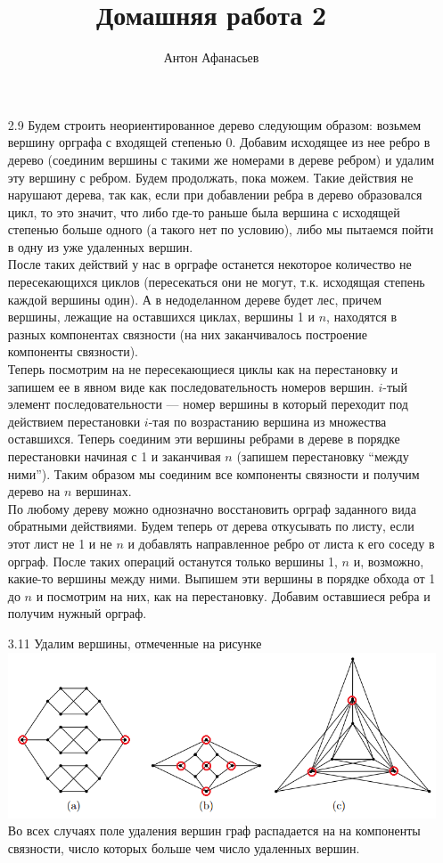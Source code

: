 \documentclass[10pt]{article}
\begin{document}
\title{Домашняя работа 2}
\author{Антон Афанасьев}
\maketitle

\begin{enumerate}

\item[2.9] Будем строить неориентированное дерево следующим образом: возьмем вершину орграфа с входящей степенью 0. Добавим исходящее из нее ребро в дерево (соединим вершины с такими же номерами в дереве ребром) и удалим эту вершину с ребром. Будем продолжать, пока можем. Такие действия не нарушают дерева, так как, если при добавлении ребра в дерево образовался цикл, то это значит, что либо где-то раньше была вершина с исходящей степенью больше одного (а такого нет по условию), либо мы пытаемся пойти в одну из уже удаленных вершин.\\
После таких действий у нас в орграфе останется некоторое количество не пересекающихся циклов (пересекаться они не могут, т.к. исходящая степень каждой вершины один). А в недоделанном дереве будет лес, причем вершины, лежащие на оставшихся циклах, вершины 1 и $n$, находятся в разных компонентах связности (на них заканчивалось построение компоненты связности).\\
Теперь посмотрим на не пересекающиеся циклы как на перестановку и запишем ее в явном виде как последовательность номеров вершин. $i$-тый элемент последовательности --- номер вершины в который переходит под действием перестановки $i$-тая по возрастанию вершина из множества оставшихся. Теперь соединим эти вершины ребрами в дереве в порядке перестановки начиная с 1 и заканчивая $n$ (запишем перестановку ``между ними''). Таким образом мы соединим все компоненты связности и получим дерево на $n$ вершинах.\\
По любому дереву можно однозначно восстановить орграф заданного вида обратными действиями. Будем теперь от дерева откусывать по листу, если этот лист не 1 и не $n$ и добавлять направленное ребро от листа к его соседу в орграф. После таких операций останутся только вершины 1, $n$ и, возможно, какие-то вершины между ними. Выпишем эти вершины в порядке обхода от 1 до $n$ и посмотрим на них, как на перестановку. Добавим оставшиеся ребра и получим нужный орграф.

\item[3.11] Удалим вершины, отмеченные на рисунке\\
\includegraphics[width=\textwidth]{3_11.png}
Во всех случаях поле удаления вершин граф распадается на на компоненты связности, число которых больше чем число удаленных вершин.


\end{enumerate}
\end{document}
